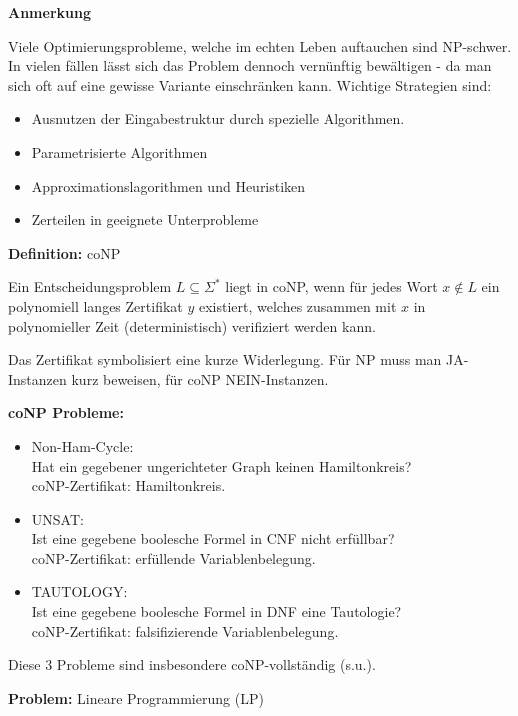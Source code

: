 \documentclass[a4paper,graphics,11pt]{article}
\begin{document}
\textbf{Anmerkung}

Viele Optimierungsprobleme, welche im echten Leben auftauchen sind \textsf{NP}-schwer. In vielen
fällen lässt sich das Problem dennoch vernünftig bewältigen - da man sich oft auf eine gewisse Variante
einschränken kann. Wichtige Strategien sind:
\begin{itemize}
    \item Ausnutzen der Eingabestruktur durch spezielle Algorithmen.
    \item Parametrisierte Algorithmen
    \item Approximationslagorithmen und Heuristiken
    \item Zerteilen in geeignete Unterprobleme
\end{itemize}

\textbf{Definition:} \textsf{coNP}

Ein Entscheidungsproblem $L \subseteq \Sigma^*$ liegt in \textsf{coNP}, wenn für
jedes Wort $x \notin L$ ein polynomiell langes Zertifikat $y$ existiert, welches
zusammen mit $x$ in polynomieller Zeit (deterministisch) verifiziert werden kann.

Das Zertifikat symbolisiert eine kurze Widerlegung. Für \textsf{NP} muss man JA-Instanzen
kurz beweisen, für \textsf{coNP} NEIN-Instanzen.

\strut

\textbf{\textsf{coNP} Probleme:}
\begin{itemize}
    \item Non-Ham-Cycle:\\
        Hat ein gegebener ungerichteter Graph keinen Hamiltonkreis?\\[5pt]
        \textsf{coNP}-Zertifikat: Hamiltonkreis.
    \item UNSAT:\\
        Ist eine gegebene boolesche Formel in CNF nicht erfüllbar?\\[5pt]
        \textsf{coNP}-Zertifikat: erfüllende Variablenbelegung.
    \item TAUTOLOGY:\\
        Ist eine gegebene boolesche Formel in DNF eine Tautologie?\\[5pt]
        \textsf{coNP}-Zertifikat: falsifizierende Variablenbelegung.
\end{itemize}
Diese 3 Probleme sind insbesondere \textsf{coNP}-vollständig (s.u.).

\newpage

\textbf{Problem:} Lineare Programmierung (LP)
\end{document}
